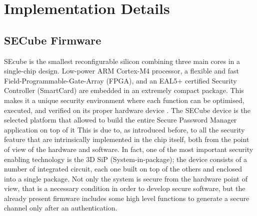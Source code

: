 \chapter{Implementation Details}

\section{SECube Firmware}
SEcube is the smallest reconfigurable silicon combining three main cores in a single-chip design. Low-power ARM Cortex-M4 processor, a flexible and fast Field-Programmable-Gate-Array (FPGA), and an EAL5+ certified Security Controller (SmartCard) are embedded in an extremely compact package. This makes it a unique security environment where each function can be optimised, executed, and verified on its proper hardware device \cite{secubesite}.
The SECube device is the selected platform that allowed to build the entire Secure Password Manager application on top of it This is due to, as introduced before, to all the security feature that are intrinsically implemented in the chip itself, both from the point of view of the hardware and software.\newline\newline
In fact, one of the most important security enabling technology is the 3D SiP (System-in-package); the device consists of a number of integrated circuit, each one built on top of the others and enclosed into a single package.\newline\newline
Not only the system is secure from the hardware point of view, that is a necessary condition in order to develop secure software, but the already present firmware includes some high level functions to generate a secure channel only after an authentication.

